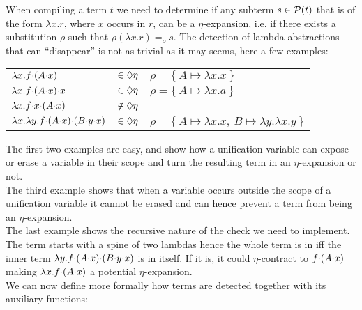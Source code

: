 \documentclass[sigconf,natbib=false,review]{acmart}
\newcommand{\appsep}{\ensuremath{\textcolor{lightgray}{\cdot}}}
\newcommand{\EqualRel}{\ensuremath{=}}
\newcommand{\Eo}{\ensuremath{\EqualRel_o}\xspace}
\begin{document}
When compiling a term $t$ we need to determine if any
subterm $s \in \mathcal{P}(t)$ that is of the form $\lambda x. r$,
where $x$ occurs in $r$, can be a $\eta$-expansion, i.e. if
there exists a substitution $\rho$ such that $\rho (\lambda x.r) \Eo s$.
The detection of lambda abstractions that can ``disappear''
is not as trivial as it may seems, here a few examples:
%
\begin{center}
  \begin{tabular}{lll}
    $\lambda x. f \appsep (A \appsep x)$ & $\in\Diamond\eta$ & $\rho = \{~ A \mapsto \lambda x.x ~\}$ \\
    $\lambda x. f \appsep (A \appsep x) \appsep x$ & $\in\Diamond\eta$ & $\rho = \{~ A \mapsto \lambda x.a ~\}$\\
    $\lambda x. f \appsep x \appsep (A \appsep x)$ & $\not\in\Diamond\eta$ &\\
    $\lambda x. \lambda y. f \appsep (A \appsep x) \appsep (B \appsep y \appsep x)$ & $\in\Diamond\eta$ & $\rho = \{~ A \mapsto \lambda x.x,~ B \mapsto \lambda y.\lambda x.y ~\}$
  \end{tabular}
\end{center}
\vspace{4pt}

\noindent
The first two examples are easy, and show how a unification variable can expose
or erase a variable in their scope and turn the resulting term in an $\eta$-expansion or not.\\
The third example shows that when a variable occurs outside the scope of a unification
variable it cannot be erased and can hence prevent a term from being an $\eta$-expansion.\\
The last example shows the recursive nature of the check we need to implement.
The term starts with a spine of two lambdas hence the whole term
is in \maybeeta iff the inner term $\lambda y.f\appsep (A \appsep x) \appsep (B \appsep y \appsep x)$
is in \maybeeta itself. If it is, it could $\eta$-contract to
$f \appsep (A \appsep x)$ making $\lambda x.f \appsep (A \appsep x)$ a potential
$\eta$-expansion.\\
We can now define more formally how \maybeeta terms are detected together with
its auxiliary functions:
\end{document}
